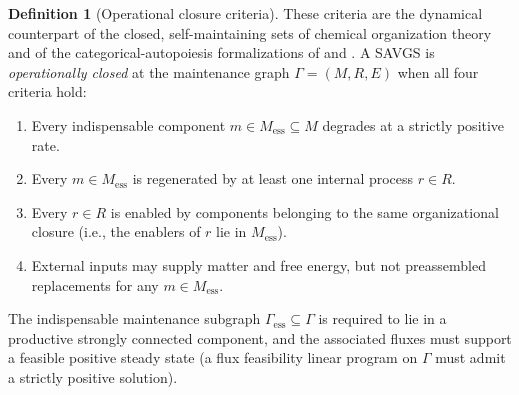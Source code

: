 \documentclass[11pt,a4paper]{article}
\theoremstyle{plain}
\theoremstyle{definition}
\newtheorem{definition}[theorem]{Definition}
\theoremstyle{remark}
\begin{document}
\begin{definition}[Operational closure criteria]
\label{def:closure-criteria}
These criteria are the dynamical counterpart of the closed,
self-maintaining sets of chemical organization
theory~\citep{dittrich2007cot} and of the categorical-autopoiesis
formalizations of \citet{hirota2023alife}
and \citet{segura2026topos}. A SAVGS is \emph{operationally closed}
at the maintenance graph
$\Gamma = (M, R, E)$ when all four criteria hold:
\begin{enumerate}[leftmargin=*,itemsep=2pt]
\item Every indispensable component $m \in M_{\mathrm{ess}} \subseteq
M$ degrades at a strictly positive rate.
\item Every $m \in M_{\mathrm{ess}}$ is regenerated by at least one
internal process $r \in R$.
\item Every $r \in R$ is enabled by components belonging to the same
organizational closure (i.e., the enablers of $r$ lie in
$M_{\mathrm{ess}}$).
\item External inputs may supply matter and free energy, but not
preassembled replacements for any $m \in M_{\mathrm{ess}}$.
\end{enumerate}
The indispensable maintenance subgraph
$\Gamma_{\mathrm{ess}} \subseteq \Gamma$ is required to lie in a
productive strongly connected component, and the associated fluxes
must support a feasible positive steady state (a flux feasibility
linear program on $\Gamma$ must admit a strictly positive solution).
\end{definition}
\end{document}
